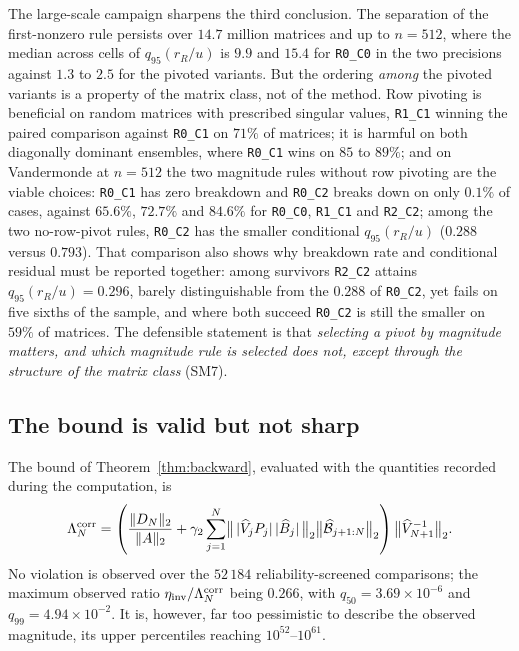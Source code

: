 \documentclass[review,onefignum,onetabnum]{siamart251216}
\begin{document}
The large-scale campaign sharpens the third conclusion. The separation of the first-nonzero rule
persists over $14.7$ million matrices and up to $n=512$, where the median across cells of
$q_{95}(r_R/u)$ is $9.9$ and $15.4$ for \texttt{R0\_C0} in the two precisions against $1.3$ to
$2.5$ for the pivoted variants. But the ordering \emph{among} the pivoted variants is a property
of the matrix class, not of the method. Row pivoting is beneficial on random matrices with prescribed singular values, \texttt{R1\_C1}
winning the paired comparison against \texttt{R0\_C1} on $71\%$ of matrices; it is harmful on
both diagonally dominant ensembles, where \texttt{R0\_C1} wins on $85$ to $89\%$; and on
Vandermonde at $n=512$ the two magnitude rules without row pivoting are the viable choices:
\texttt{R0\_C1} has zero breakdown and \texttt{R0\_C2} breaks down on only $0.1\%$ of cases,
against $65.6\%$, $72.7\%$ and $84.6\%$ for \texttt{R0\_C0}, \texttt{R1\_C1} and
\texttt{R2\_C2}; among the two no-row-pivot rules, \texttt{R0\_C2} has the smaller conditional
$q_{95}(r_R/u)$ ($0.288$ versus $0.793$). That comparison also shows why breakdown rate and
conditional residual must be reported together:
among survivors \texttt{R2\_C2} attains $q_{95}(r_R/u)=0.296$, barely distinguishable from the
$0.288$ of \texttt{R0\_C2}, yet fails on five sixths of the sample, and where both succeed
\texttt{R0\_C2} is still the smaller on $59\%$ of matrices. The defensible statement is that
\emph{selecting a pivot by magnitude matters, and which magnitude rule is selected does not,
except through the structure of the matrix class} (SM7).

\subsection{The bound is valid but not sharp}
\label{sec:law}

The bound of Theorem~\ref{thm:backward}, evaluated with the quantities recorded during the
computation, is
%
\begin{equation}\label{eq:corrected-bound}
\Lambda_N^{\rm corr}
= \left(\frac{\|D_N\|_2}{\|A\|_2}
+ \gamma_2\sum_{j=1}^{N}\bigl\|\,|\widehat V_jP_j|\,|\widehat B_j|\,\bigr\|_2
\bigl\|\widehat{\mathcal B}_{j+1:N}\bigr\|_2\right)
\bigl\|\widehat V_{N+1}^{-1}\bigr\|_2 .
\end{equation}
%
No violation is observed over the $52\,184$ reliability-screened comparisons; the maximum observed ratio
$\eta_{\mathrm{inv}}/\Lambda_N^{\rm corr}$ being $0.266$, with $q_{50}=3.69\times10^{-6}$ and
$q_{99}=4.94\times10^{-2}$. It is, however, far too pessimistic to describe the observed
magnitude, its upper percentiles reaching $10^{52}$--$10^{61}$.
\end{document}
